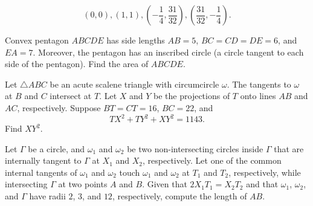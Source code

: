\begin{solution}[name={Solution by pieater314159}]
	$$(0,0),(1,1),\left(-\frac{1}{4},\frac{31}{32}\right),\left(\frac{31}{32},-\frac{1}{4}\right).$$
\end{solution}




\begin{question}[name={2020 AIME II, \href{https://artofproblemsolving.com/community/c4p15680983}{Problem 13}}]
	Convex pentagon $ABCDE$ has side lengths $AB=5$, $BC=CD=DE=6$, and $EA=7$. Moreover, the pentagon has an inscribed circle (a circle tangent to each side of the pentagon). Find the area of $ABCDE$.
\end{question}


%	












\begin{question}[name={2020 AIME II, \href{https://artofproblemsolving.com/community/c4p15680911}{Problem 15}}]
	Let $\triangle ABC$ be an acute scalene triangle with circumcircle $\omega$. The tangents to $\omega$ at $B$ and $C$ intersect at $T$. Let $X$ and $Y$ be the projections of $T$ onto lines $AB$ and $AC$, respectively. Suppose $BT=CT=16$, $BC=22$, and $$TX^2+TY^2+XY^2=1143.$$ Find $XY^2$.
\end{question}


%	


\begin{question}[name={2020 HMMT, Geometry, \href{https://artofproblemsolving.com/community/c129h2008244p14065144}{Problem 7}}]
	Let $\Gamma$ be a circle, and $\omega_1$ and $\omega_2$ be two non-intersecting circles inside $\Gamma$ that are internally tangent to $\Gamma$ at $X_1$ and $X_2$, respectively. Let one of the common internal tangents of $\omega_1$ and $\omega_2$ touch $\omega_1$ and $\omega_2$ at $T_1$ and $T_2$, respectively, while intersecting $\Gamma$ at two points $A$ and $B$. Given that $2X_1T_1=X_2T_2$ and that $\omega_1$, $\omega_2$, and $\Gamma$ have radii $2$, $3$, and $12$, respectively, compute the length of $AB$.
\end{question}

